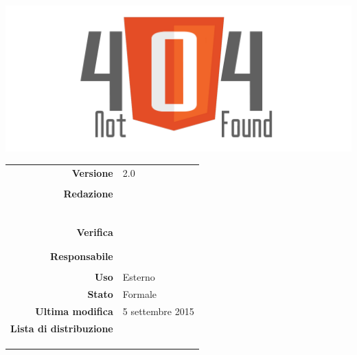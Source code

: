 \thispagestyle{empty}

\begin{titlepage}

	\begin{center}
	\begin{Huge}
		\textbf{\gruppo} \\
	\end{Huge}
	\vspace{0.5cm}
	\begin{Large}
		\textbf{\capitolato}
	\end{Large}
	
	\vspace{1cm}

	\includegraphics[scale=0.35]{../logo/logo404_Extends.png}
	\vspace{1cm}
	\begin{Huge}
		\textbf{\titDoc}
	\end{Huge}
	
	\vspace{1cm}
	
	\begin{table}[h]
	\begin{center}
	\begin{tabular}{r | l}
		\textbf{Versione} & 2.0 \\ \\
		\textbf{Redazione} & \GoIs \\ 
			& \ReAn \\ 
			& \VeFe \\
			& \MaMo \\
			& \DeEn \\
			& \CaMa \\ \\
		\textbf{Verifica} & \VeFe \\ 
			& \CoMa \\ \\
		\textbf{Responsabile} &\CaMa \\ \\
		\textbf{Uso} & Esterno \\
		\textbf{Stato} & Formale \\
		\textbf{Ultima modifica} & 5 settembre 2015 \\
		\textbf{Lista di distribuzione} & \gruppo \\
			& \Vardanega \\
			& \Cardin \\
			& \Zucchetti \\
	\end{tabular}
	\end{center}
	\end{table}
	\end{center}
\end{titlepage}
